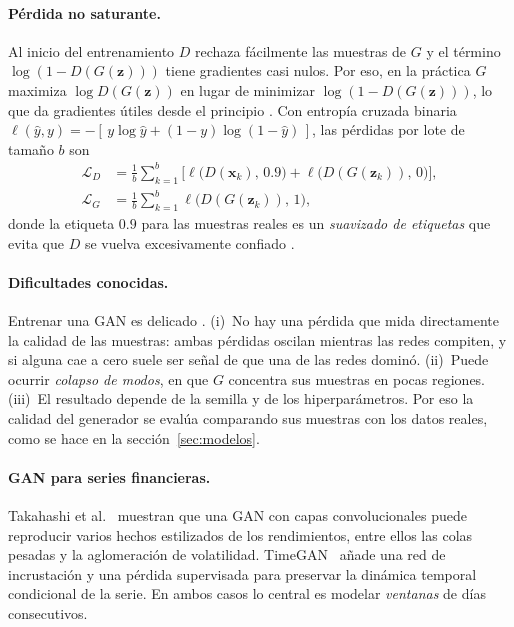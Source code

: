 \documentclass[12pt,letterpaper]{article}
\begin{document}
\paragraph{Pérdida no saturante.}
Al inicio del entrenamiento $D$ rechaza fácilmente las muestras de $G$ y el término $\log(1-D(G(\mathbf z)))$ tiene gradientes casi nulos. Por eso, en la práctica $G$ maximiza $\log D(G(\mathbf z))$ en lugar de minimizar $\log(1-D(G(\mathbf z)))$, lo que da gradientes útiles desde el principio \cite{goodfellow2014, googlegan}. Con entropía cruzada binaria $\ell(\hat y,y)=-[\,y\log\hat y+(1-y)\log(1-\hat y)\,]$, las pérdidas por lote de tamaño $b$ son
\begin{align}
  \mathcal L_D &= \frac1b\sum_{k=1}^{b}\Big[\ell\big(D(\mathbf x_k),\,0.9\big)+\ell\big(D(G(\mathbf z_k)),\,0\big)\Big], \label{eq:LD}\\
  \mathcal L_G &= \frac1b\sum_{k=1}^{b}\ell\big(D(G(\mathbf z_k)),\,1\big), \label{eq:LG}
\end{align}
donde la etiqueta $0.9$ para las muestras reales es un \emph{suavizado de etiquetas} que evita que $D$ se vuelva excesivamente confiado \cite{salimans2016}.

\paragraph{Dificultades conocidas.}
Entrenar una GAN es delicado \cite{googlegan}. (i)~No hay una pérdida que mida directamente la calidad de las muestras: ambas pérdidas oscilan mientras las redes compiten, y si alguna cae a cero suele ser señal de que una de las redes dominó. (ii)~Puede ocurrir \emph{colapso de modos}, en que $G$ concentra sus muestras en pocas regiones. (iii)~El resultado depende de la semilla y de los hiperparámetros. Por eso la calidad del generador se evalúa comparando sus muestras con los datos reales, como se hace en la sección~\ref{sec:modelos}.

\paragraph{GAN para series financieras.}
Takahashi et al.~\cite{takahashi2019} muestran que una GAN con capas convolucionales puede reproducir varios hechos estilizados de los rendimientos, entre ellos las colas pesadas y la aglomeración de volatilidad. TimeGAN~\cite{yoon2019} añade una red de incrustación y una pérdida supervisada para preservar la dinámica temporal condicional de la serie. En ambos casos lo central es modelar \emph{ventanas} de días consecutivos.
\end{document}
